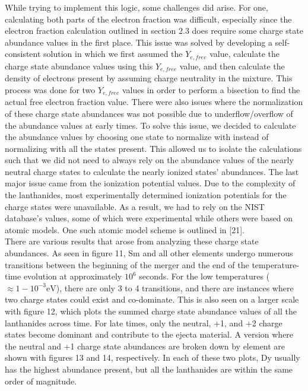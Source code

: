\documentclass[11pt,a4paper]{article}
\begin{document}
\vspace{.5 cm}


While trying to implement this logic, some challenges did arise. For one, calculating both parts of the electron fraction was difficult, especially since the electron fraction calculation outlined in section 2.3 does require some charge state abundance values in the first place. This issue was solved by developing a self-consistent solution in which we first assumed the $Y_{e,free}$ value, calculate the charge state abundance values using this $Y_{e,free}$ value, and then calculate the density of electrons present by assuming charge neutrality in the mixture. This process was done for two $Y_{e,free}$ values in order to perform a bisection to find the actual free electron fraction value. There were also issues where the normalization of these charge state abundances was not possible due to underflow/overflow of the abundance values at early times. To solve this issue, we decided to calculate the abundance values by choosing one state to normalize with instead of normalizing with all the states present. This allowed us to isolate the calculations such that we did not need to always rely on the abundance values of the nearly neutral charge states to calculate the nearly ionized states' abundances. The last major issue came from the ionization potential values. Due to the complexity of the lanthanides, most experimentally determined ionization potentials for the charge states were unavailable. As a result, we had to rely on the NIST database's values, some of which were experimental while others were based on atomic models. One such atomic model scheme \cite{Rodrigues_2004} is outlined in [21].  \\

There are various results that arose from analyzing these charge state abundances. As seen in figure 11, Sm and all other elements undergo numerous transitions between the beginning of the merger and the end of the temperature-time evolution at approximately $10^6$ seconds. For the low temperatures ($\approx 1 - 10^{-3} \mathrm{eV}$), there are only 3 to 4 transitions, and there are instances where two charge states could exist and co-dominate. This is also seen on a larger scale with figure 12, which plots the summed charge state abundance values of all the lanthanides across time. For late times, only the neutral, +1, and +2 charge states become dominant and contribute to the ejecta material. A version where the neutral and +1 charge state abundances are broken down by element are shown with figures 13 and 14, respectively. In each of these two plots, Dy usually has the highest abundance present, but all the lanthanides are within the same order of magnitude.
\end{document}
